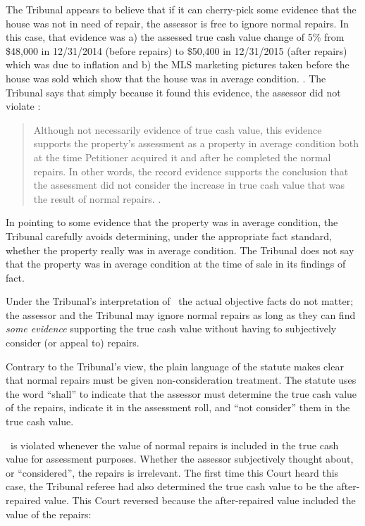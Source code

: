 \documentclass[12pt,\documentclassflag]{michiganCourtOfAppealsBrief}
\begin{document}
The Tribunal appears to believe that if it can cherry-pick some evidence that the house was not in need of repair, the assessor is free to ignore normal repairs.
In this case, that evidence was a) the assessed true cash value change of 5\% from \$48,000 in 12/31/2014 (before repairs) to \$50,400 in 12/31/2015 (after repairs) which was due to inflation and b) the MLS marketing pictures taken before the house was sold which show that the house was in average condition. \reconsiderationDenied[2]. The Tribunal says that simply because it found this evidence, the assessor did not violate \mathieuGast:

\begin{quote}
	Although not necessarily evidence of true cash value, this evidence supports the property's assessment as a property in average condition both at the time Petitioner acquired it and after he completed the normal repairs. In other words, the record evidence supports the conclusion that the assessment did not consider the increase in true cash value that was the result of normal repairs. \reconsiderationDenied[2]. 
\end{quote}
 
In pointing to some evidence that the property was in average condition, the Tribunal carefully avoids determining, under the appropriate fact standard, whether the property really was in average condition. The Tribunal does not say that the property was in average condition at the time of sale in its findings of fact.

Under the Tribunal's interpretation of \mathieuGast\ the actual objective facts do not matter; the assessor and the Tribunal may ignore normal repairs as long as they can find {\em some evidence} supporting the true cash value without having to subjectively consider (or appeal to) repairs.

Contrary to the Tribunal's view, the plain language of the statute makes clear that normal repairs must be given non-consideration treatment. The statute uses the word ``shall'' to indicate that the assessor must determine the true cash value of the repairs, indicate it in the assessment roll, and ``not consider'' them in the true cash value.

\mathieuGast\ is violated whenever the value of normal repairs is included in the true cash value for assessment purposes. Whether the assessor subjectively thought about, or ``considered'', the repairs is irrelevant. The first time this Court heard this case, the Tribunal referee had also determined the true cash value to be the after-repaired value. This Court reversed because the after-repaired value included the value of the repairs:
\end{document}
